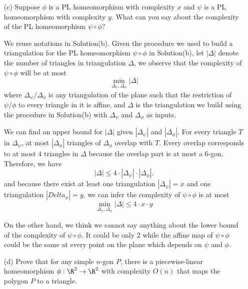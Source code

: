 \documentclass[11pt]{article}
\begin{document}
\begin{enumerate}[(a)]
\begin{solution}
\end{solution}

  \item[(c)]
    Suppose \(\phi\) is a PL homeomorphism with complexity \(x\) and \(\psi\) is a PL
    homeomorphism with complexity \(y\).
    What can you say about the complexity of the PL homeomorphism \(\psi \circ \phi\)?

\begin{solution}
  We reuse notations in Solution(b).
  Given the procedure we used to build a triangulation for the PL homeomorphism \(\psi\circ \phi\) in Solution(b), let \(|\Delta|\) denote the number of triangles in triangulation \(\Delta\), we observe that the complexity of \(\psi\circ \phi\) will be at most
  \[\min_{\Delta_{\psi},\Delta_{\phi}}|\Delta|\]
  where \(\Delta_{\psi}/\Delta_{\phi}\) is any triangulation of the plane such that the restriction of \(\psi/\phi\) to every triangle in it is affine, and \(\Delta\) is the triangulation we build using the procedure in Solution(b) with \(\Delta_{\psi}\) and \(\Delta_{\phi}\) as inputs.

  We can find an upper bound for \(|\Delta|\) given \(|\Delta_{\psi}|\) and \(|\Delta_{\phi}|\). For every triangle \(T\) in \(\Delta_{\psi}\), at most \(|\Delta_{\phi}|\) triangles of \(\Delta_{\phi}\) overlap with \(T\). Every overlap corresponds to at most \(4\) triangles in \(\Delta\) because the overlap part is at most a \(6\)-gon. Therefore, we have
  \[|\Delta|\le 4\cdot|\Delta_{\psi}|\cdot|\Delta_{\phi}|.\]
  and because there exist at least one triangulation \(|\Delta_{\psi}|=x\) and one triangulation \(|Delta_{\phi}|=y\), we can infer the complexity of \(\psi\circ\phi\) is at most
  \[\min_{\Delta_{\psi},\Delta_{\phi}}|\Delta|\le 4\cdot x\cdot y\]

  On the other hand, we think we cannot say anything about the lower bound of the complexity of \(\psi\circ\phi\). It could be only \(2\) while the affine map of \(\psi\circ\phi\) could be the same at every point on the plane which depends on \(\psi\) and \(\phi\).
\end{solution}

  \item[(d)]
    Prove that for any simple \(n\)-gon \(P\), there is a piecewise-linear homeomorphism \(\phi :
    \R^2 \to \R^2\) with complexity \(O(n)\) that maps the polygon \(P\) to a triangle.

\begin{solution}
\end{solution}


\end{enumerate}
\end{document}
